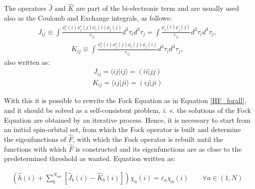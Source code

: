 \noindent The operators $\hat{J}$ and $\hat{K}$ are part of the bi-electronic
term and are usually used also as the Coulomb and Exchange integrals, as
follows:
%
\begin{align}
J_{ij} \equiv \int\frac{\phi_{i}^{\star}(i)\phi_{j}^{\star}(j)\phi_{i}(i)\phi_{j}(j)}{r_{ij}}
d^{3}\tau_{i}d^{3}\tau_{j} =
\int\frac{\rho_{i}(i)\rho_{j}(j)}{r_{ij}}d^{3}\tau_{i}d^{3}\tau_{j},
\end{align}
\begin{align}
K_{ij} \equiv \int\frac{\phi_{i}^{\star}(i)\phi_{j}^{\star}(j)\phi_{i}(j)\phi_{j}(i)}{r_{ij}}
d^{3}\tau_{i}d^{3}\tau_{j} ,
\end{align}
%
\noindent also written as:
\begin{align}
J_{ij} = \langle ij | ij \rangle = (ii|jj)
\end{align}
\begin{align}
K_{ij} = \langle ij | ji \rangle = (ij|ji)
\end{align}

With this it is possible to rewrite the Fock Equation as
in Equation \ref{HF_forall}, and it should be solved as a
self-consistent problem, \textit{i. e.} the solutions of the Fock Equation are
obtained by an iterative process. Hence, it is necessary to start from an initial
spin-orbital set, from which the Fock operator is built and determine the
eigenfunctions of $\widehat{F}$, with which the Fock operator is rebuilt until
the functions with which $\widehat{F}$ is constructed and its eigenfunctions
are as close to the predetermined threshold as wanted. Equation written as:

%
\begin{align}
\left(\widehat{h}(i) + \sum_b^{N_{occ}} [\hat{J}_b (i) - \hat{K}_b (i)]\right)\chi_a (i) =
\varepsilon_a \chi_a (i) \qquad \forall a \in (1,N)
\label{HF_forall}
\end{align}

